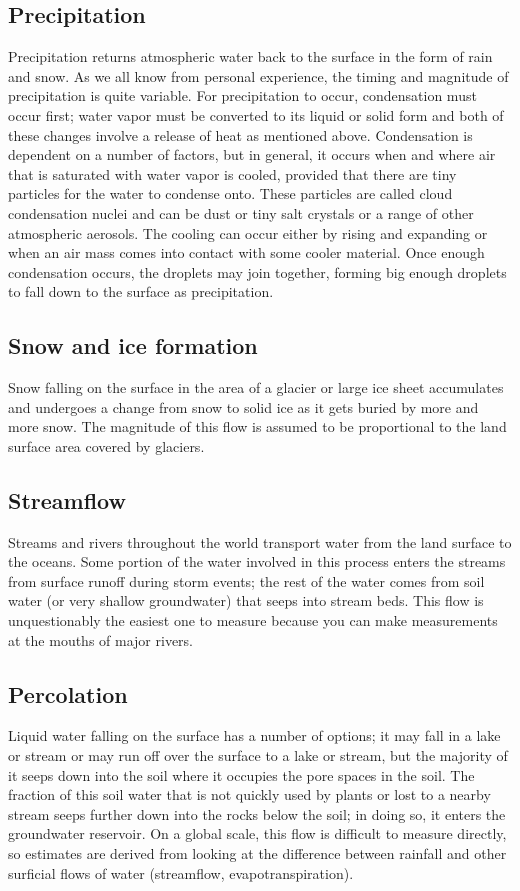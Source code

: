 \documentclass[11pt,letterpaper]{article}
\begin{document}
\subsection{Precipitation}
Precipitation returns atmospheric water back to the surface in the form of rain and snow. As we all know from personal experience, the timing and magnitude of precipitation is quite variable. For precipitation to occur, condensation must occur first; water vapor must be converted to its liquid or solid form and both of these changes involve a release of heat as mentioned above. Condensation is dependent on a number of factors, but in general, it occurs when and where air that is saturated with water vapor is cooled, provided that there are tiny particles for the water to condense onto. These particles are called cloud condensation nuclei and can be dust or tiny salt crystals or a range of other atmospheric aerosols. The cooling can occur either by rising and expanding or when an air mass comes into contact with some cooler material. Once enough condensation occurs, the droplets may join together, forming big enough droplets to fall down to the surface as precipitation.

\subsection{Snow and ice formation}
Snow falling on the surface in the area of a glacier or large ice sheet accumulates and undergoes a change from snow to solid ice as it gets buried by more and more snow. The magnitude of this flow is assumed to be proportional to the land surface area covered by glaciers.

\subsection{Streamflow}
Streams and rivers throughout the world transport water from the land surface to the oceans. Some portion of the water involved in this process enters the streams from surface runoff during storm events; the rest of the water comes from soil water (or very shallow groundwater) that seeps into stream beds. This flow is unquestionably the easiest one to measure because you can make measurements at the mouths of major rivers. 

\subsection{Percolation}
Liquid water falling on the surface has a number of options; it may fall in a lake or stream or may run off over the surface to a lake or stream, but the majority of it seeps down into the soil where it occupies the pore spaces in the soil. The fraction of this soil water that is not quickly used by plants or lost to a nearby stream seeps further down into the rocks below the soil; in doing so, it enters the groundwater reservoir. On a global scale, this flow is difficult to measure directly, so estimates are derived from looking at the difference between rainfall and other surficial flows of water (streamflow, evapotranspiration).
\end{document}
